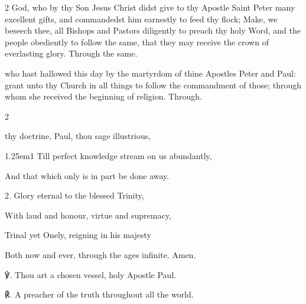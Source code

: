 \begin{paracol}{2}
\collect
{} God, who by thy Son Jesus Christ didst give to thy Apostle Saint Peter many excellent gifts, and commandedst him earnestly to feed thy flock; Make, we beseech thee, all Bishops and Pastors diligently to preach thy holy Word, and the people obediently to follow the same, that they may receive the crown of everlasting glory. Through the same.

 who hast hallowed this day by the martyrdom of thine Apostles Peter and Paul: grant unto thy Church in all things to follow the commandment of those; through whom she received the beginning of religion. Through.

\fussy	
\end{paracol}



\clearpage
{}

\firstEvensong
{}

\firstEvensongHymn

\begin{multicols}{2}
\sloppy

 thy doctrine, Paul, thou sage illustrious,


\begin{hangparas}{1.25em}{1}
Till perfect knowledge stream on us abundantly,

And that which only is in part be done away.

\newcolumn

2. Glory eternal to the blessed Trinity,

With laud and honour, virtue and supremacy,

Trinal yet Onely, reigning in his majesty

Both now and ever, through the ages infinite. Amen.\\

\end{hangparas}

\fussy	
\end{multicols}

℣. Thou art a chosen vessel, holy Apostle Paul.

℟. A preacher of the truth throughout all the world.

